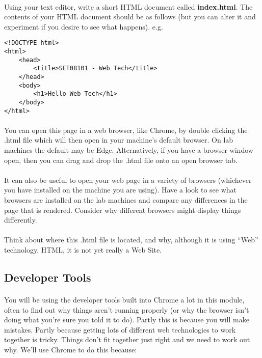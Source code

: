 \documentclass[10pt, a4paper]{article}
\begin{document}
\paragraph{} Using your text editor, write a short HTML document called {\bf index.html}. The contents of your HTML document should be as follows (but you can alter it and experiment if you desire to see what happens). e.g.

\begin{lstlisting}
<!DOCTYPE html>
<html>
    <head>
        <title>SET08101 - Web Tech</title>
    </head>
    <body>
        <h1>Hello Web Tech</h1>
    </body>
</html>
\end{lstlisting}

\paragraph{} You can open this page in a web browser, like Chrome, by double clicking the .html file which will then open in your machine's default browser. On lab machines the default may be Edge. Alternatively, if you have a browser window open, then you can drag and drop the .html file onto an open browser tab.

\paragraph{} It can also be useful to open your web page in a variety of browsers (whichever you have installed on the machine you are using). Have a look to see what browsers are installed on the lab machines and compare any differences in the page that is rendered. Consider why different browsers might display things differently.

\paragraph{} Think about where this .html file is located, and why, although it is using ``Web'' technology, HTML, it is not yet really a Web Site.


\subsection{Developer Tools}
\paragraph{} You will be using the developer tools built into Chrome a lot in this module, often to find out why things aren't running properly (or why the browser isn't doing what you're sure you told it to do). Partly this is because you will make mistakes. Partly because getting lots of different web technologies to work together is tricky. Things don't fit together just right and we need to work out why. We'll use Chrome to do this because:
\end{document}
